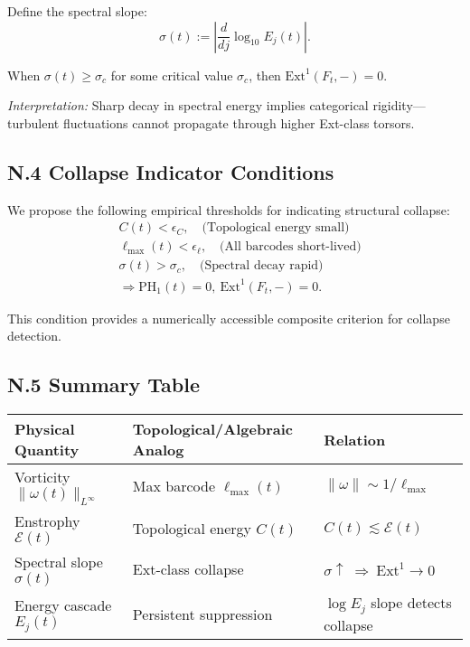\documentclass[11pt]{article}
\theoremstyle{definition}
\begin{document}
Define the spectral slope:
\[
\sigma(t) := \left| \frac{d}{dj} \log_{10} E_j(t) \right|.
\]

\begin{conjecture}
When \( \sigma(t) \geq \sigma_c \) for some critical value \( \sigma_c \), then \( \mathrm{Ext}^1(F_t, -) = 0 \).
\end{conjecture}

\textit{Interpretation:} Sharp decay in spectral energy implies categorical rigidity—turbulent fluctuations cannot propagate through higher Ext-class torsors.

\subsection*{N.4 Collapse Indicator Conditions}

We propose the following empirical thresholds for indicating structural collapse:
\[
\begin{aligned}
& C(t) < \epsilon_C, \quad \text{(Topological energy small)} \\
& \ell_{\max}(t) < \epsilon_\ell, \quad \text{(All barcodes short-lived)} \\
& \sigma(t) > \sigma_c, \quad \text{(Spectral decay rapid)} \\
& \Rightarrow \mathrm{PH}_1(t) = 0,\ \mathrm{Ext}^1(F_t, -) = 0.
\end{aligned}
\]

This condition provides a numerically accessible composite criterion for collapse detection.

\subsection*{N.5 Summary Table}

\begin{center}
\renewcommand{\arraystretch}{1.3}
\begin{tabular}{|l|l|l|}
\hline
\textbf{Physical Quantity} & \textbf{Topological/Algebraic Analog} & \textbf{Relation} \\
\hline
Vorticity \( \|\omega(t)\|_{L^\infty} \) & Max barcode \( \ell_{\max}(t) \) & \( \|\omega\| \sim 1/\ell_{\max} \) \\
Enstrophy \( \mathcal{E}(t) \) & Topological energy \( C(t) \) & \( C(t) \lesssim \mathcal{E}(t) \) \\
Spectral slope \( \sigma(t) \) & Ext-class collapse & \( \sigma \uparrow \ \Rightarrow \ \mathrm{Ext}^1 \to 0 \) \\
Energy cascade \( E_j(t) \) & Persistent suppression & \( \log E_j \) slope detects collapse \\
\hline
\end{tabular}
\end{center}
\end{document}
